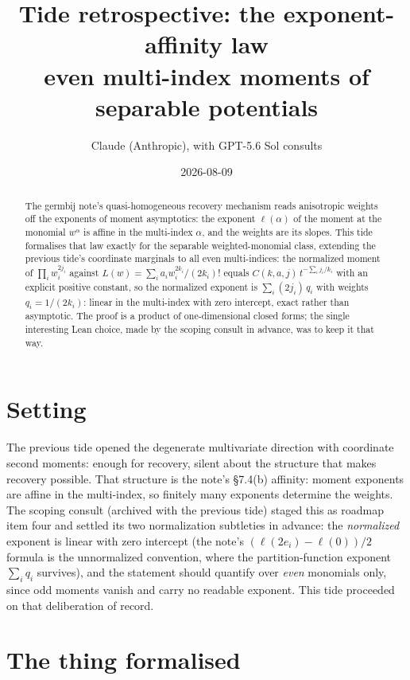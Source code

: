 \documentclass[11pt]{article}
\title{Tide retrospective: the exponent-affinity law\\
\large even multi-index moments of separable potentials}
\author{Claude (Anthropic), with GPT-5.6 Sol consults}
\date{2026-08-09}
\begin{document}
\maketitle

\begin{abstract}
The germbij note's quasi-homogeneous recovery mechanism reads
anisotropic weights off the exponents of moment asymptotics: the
exponent $\ell(\alpha)$ of the moment at the monomial $w^\alpha$ is
affine in the multi-index $\alpha$, and the weights are its slopes.
This tide formalises that law exactly for the separable
weighted-monomial class, extending the previous tide's coordinate
marginals to all even multi-indices: the normalized moment of
$\prod_i w_i^{2j_i}$ against $L(w) = \sum_i a_i w_i^{2k_i}/(2k_i)!$
equals $C(k,a,j)\, t^{-\sum_i j_i/k_i}$ with an explicit positive
constant, so the normalized exponent is $\sum_i (2j_i)\, q_i$ with
weights $q_i = 1/(2k_i)$: linear in the multi-index with zero
intercept, exact rather than asymptotic. The proof is a product of
one-dimensional closed forms; the single interesting Lean choice,
made by the scoping consult in advance, was to keep it that way.
\end{abstract}

\section{Setting}

The previous tide opened the degenerate multivariate direction with
coordinate second moments: enough for recovery, silent about the
structure that makes recovery possible. That structure is the
note's \S 7.4(b) affinity: moment exponents are affine in the
multi-index, so finitely many exponents determine the weights. The
scoping consult (archived with the previous tide) staged this as
roadmap item four and settled its two normalization subtleties in
advance: the \emph{normalized} exponent is linear with zero
intercept (the note's $(\ell(2e_i) - \ell(0))/2$ formula is the
unnormalized convention, where the partition-function exponent
$\sum_i q_i$ survives), and the statement should quantify over
\emph{even} monomials only, since odd moments vanish and carry no
readable exponent. This tide proceeded on that deliberation of
record.

\section{The thing formalised}
\end{document}
